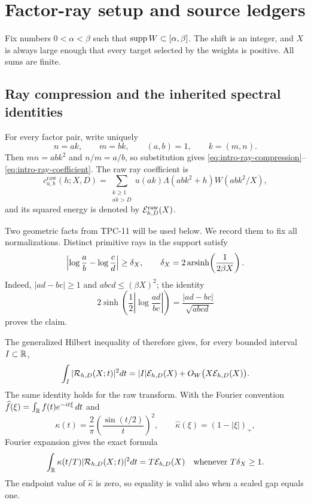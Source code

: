 \section{Factor-ray setup and source ledgers}
\label{sec:setup}

Fix numbers $0<\alpha<\beta$ such that
$\operatorname{supp} W\subset[\alpha,\beta]$.  The shift is an integer, and $X$ is
always large enough that every target selected by the weights is positive.
All sums are finite.

\subsection{Ray compression and the inherited spectral identities}

For every factor pair, write uniquely
\begin{equation}
 n=ak,\qquad m=bk,\qquad (a,b)=1,\qquad k=(m,n).
 \label{eq:ray-coordinates}
\end{equation}
Then $mn=abk^2$ and $n/m=a/b$, so substitution gives
\eqref{eq:intro-ray-compression}--\eqref{eq:intro-ray-coefficient}.
The raw ray coefficient is
\begin{equation}
 c^{\mathrm{raw}}_{a,b}(h;X,D)=
 \sum_{\substack{k\geq1\\ak>D}}
 u(ak)\Lambda(abk^2+h)W(abk^2/X),
 \label{eq:raw-ray-coefficient}
\end{equation}
and its squared energy is denoted by $\mathcal E^{\mathrm{raw}}_{h,D}(X)$.

Two geometric facts from TPC-11 will be used below.  We record them to
fix all normalizations.  Distinct primitive rays in the support satisfy
\begin{equation}
 \left|\log\frac ab-\log\frac cd\right|
 \geq
 \delta_X,
 \qquad
 \delta_X=2\operatorname{arsinh}\!\left(\frac1{2\beta X}\right).
 \label{eq:ray-spacing}
\end{equation}
Indeed, $|ad-bc|\geq1$ and $abcd\leq(\beta X)^2$; the identity
\[
 2\sinh\!\left(\frac12\left|\log\frac{ad}{bc}\right|\right)
 =\frac{|ad-bc|}{\sqrt{abcd}}
\]
proves the claim.

The generalized Hilbert inequality of \citet{MontgomeryVaughan1974}
therefore gives, for every bounded interval $I\subset\mathbb R$,
\begin{equation}
 \int_I|\mathcal R_{h,D}(X;t)|^2dt
 =|I|\mathcal E_{h,D}(X)+O_W\bigl(X\mathcal E_{h,D}(X)\bigr).
 \label{eq:MV-ray-law}
\end{equation}
The same identity holds for the raw transform.  With the Fourier convention
$\widehat f(\xi)=\int_\mathbb R f(t)e^{-it\xi}\,dt$ and
\begin{equation}
 \kappa(t)=\frac2\pi\left(\frac{\sin(t/2)}t\right)^2,
 \qquad
 \widehat\kappa(\xi)=(1-|\xi|)_+,
 \label{eq:Fejer-kernel}
\end{equation}
Fourier expansion gives the exact formula
\begin{equation}
 \int_\mathbb R\kappa(t/T)|\mathcal R_{h,D}(X;t)|^2dt
 =T\mathcal E_{h,D}(X)
 \quad\text{whenever }T\delta_X\geq1.
 \label{eq:exact-Fejer-law}
\end{equation}
The endpoint value of $\widehat\kappa$ is zero, so equality is valid also
when a scaled gap equals one.

